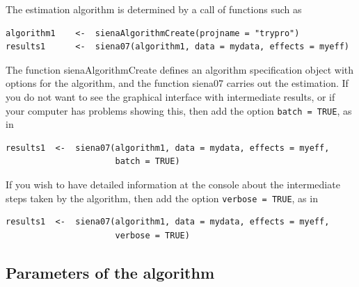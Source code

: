 \documentclass[a4paper,fleqn,11pt]{article}
\newcommand{\+}{\, + \,}
\begin{document}
The estimation algorithm is determined by a call of functions
such as
\begin{verbatim}
algorithm1    <-  sienaAlgorithmCreate(projname = "trypro")
results1      <-  siena07(algorithm1, data = mydata, effects = myeff)
\end{verbatim}
The function \textsf{sienaAlgorithmCreate} defines an algorithm specification
object with options for the algorithm, and the function  \textsf{siena07}
carries out the estimation.
If you do not want to see the graphical interface with intermediate
results, or if your computer has problems showing this, then add
the option \texttt{batch = TRUE}, as in
\begin{verbatim}
results1  <-  siena07(algorithm1, data = mydata, effects = myeff,
                      batch = TRUE)
\end{verbatim}
If you wish to have detailed information at the console about the intermediate
steps taken by the algorithm, then add
the option \texttt{verbose = TRUE}, as in
\begin{verbatim}
results1  <-  siena07(algorithm1, data = mydata, effects = myeff,
                      verbose = TRUE)
\end{verbatim}

\subsection{Parameters of the algorithm}
\label{S_param}
\end{document}
